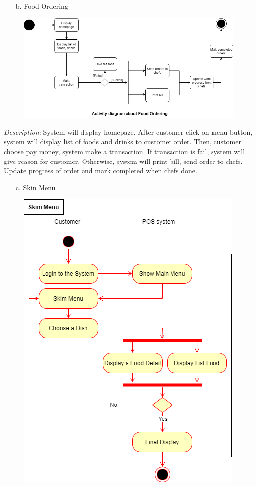 \documentclass[11pt]{article}
\begin{document}
        \begin{enumerate}
            \item[b. ] Food Ordering
        \end{enumerate}
            \begin{figure}[!h]
                \centering
                \includegraphics[scale=0.58]{Activity diagram/FoodOrdering.png}
            \end{figure}
            \textit{Description:} System will display homepage. After customer click on menu button, system will display list of foods and drinks to customer order. Then, customer choose pay money, system make a  transaction. If transaction is fail, system will give reason for customer. Otherwise, system will print bill, send order to chefs. Update progress of order and mark completed when chefs done.
        \begin{enumerate}
            \item[c. ] Skin Menu
        \end{enumerate}
            \begin{figure}[!h]
                \centering
                \includegraphics[scale=0.53]{Activity diagram/Skim Menu.png}
            \end{figure}
\end{document}
